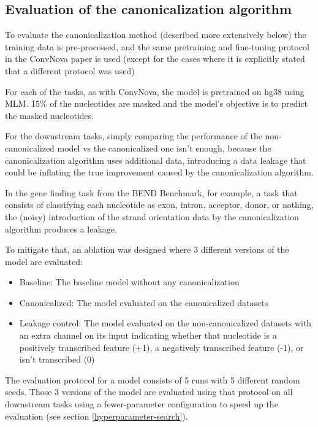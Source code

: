 \documentclass[   ]{article}
\begin{document}
\subsection{Evaluation of the canonicalization algorithm}
\label{sec:methods_evaluation_canonicalizaiton_algorithms}

To evaluate the canonicalization method (described more extensively below) the training data is
pre-processed, and the same pretraining and fine-tuning protocol 
in the ConvNova paper is used (except for the cases where it is
explicitly stated that a different protocol was used)

For each of the tasks, as with ConvNova, the model is pretrained on hg38
using MLM. 15\% of the nucleotides are masked and the model's objective
is to predict the masked nucleotides.

For the downstream tasks, simply comparing the performance of the non-canonicalized model vs the canonicalized one isn't enough, because the canonicalization algorithm uses additional data, introducing a data leakage that could be inflating the true improvement caused by the canonicalization algorithm.

In the gene finding task from the BEND Benchmark, for example, a task that
consists of classifying each nucleotide as exon, intron, acceptor,
donor, or nothing, the (noisy) introduction of the strand orientation data by the canonicalization algorithm produces a leakage.

To mitigate that, an ablation was designed where 3 different versions of the model are evaluated:
\begin{itemize}
	\item Baseline: The baseline model without any canonicalization
	\item Canonicalized: The model evaluated on the canonicalized datasets
	\item Leakage control: The model evaluated on the non-canonicalized datasets with an extra channel on its input indicating whether that nucleotide is a positively transcribed feature (+1), a negatively transcribed feature (-1), or isn't transcribed (0)
\end{itemize}

The evaluation protocol for a model consists of 5 runs with 5 different random seeds. Those 3 versions of the model are evaluated using that protocol on all downstream tasks using a fewer-parameter configuration to speed up the evaluation (see section \ref{hyperparameter-search}).
\end{document}
